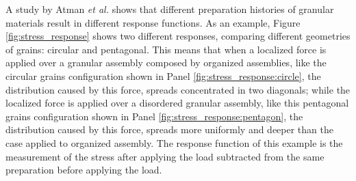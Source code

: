     A study by Atman \textit{et al.} \cite{Sensitivity_of_Stress_Response_Function_to_Packing_Preparation} shows that different preparation histories of granular materials result in different response functions. As an example, Figure \ref{fig:stress_response} shows two different responses, comparing different geometries of grains: circular and pentagonal. This means that when a localized force is applied over a granular assembly composed by organized assemblies, like the circular grains configuration shown in Panel \ref{fig:stress_response:circle}, the distribution caused by this force, spreads concentrated in two diagonals; while the localized force is applied over a disordered granular assembly, like this pentagonal grains configuration shown in Panel \ref{fig:stress_response:pentagon}, the distribution caused by this force, spreads more uniformly and deeper than the case applied to organized assembly. The response function of this example is the measurement of the stress after applying the load subtracted from the same preparation before applying the load.

